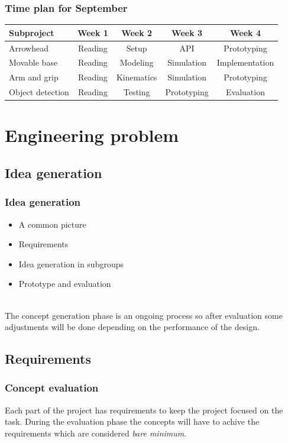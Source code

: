\documentclass{beamer}
\begin{document}
\begin{frame}
    \frametitle{Time plan for September}
    \begin{table}
        \begin{tabular}{l | c | c | c | c }
        Subproject & Week 1 & Week 2 & Week 3 & Week 4 \\
        \hline \hline
            Arrowhead & Reading& Setup & API & Prototyping\\
            Movable base & Reading& Modeling & Simulation & Implementation\\
            Arm and grip  & Reading & Kinematics & Simulation& Prototyping\\
            Object detection & Reading & Testing & Prototyping & Evaluation\\
        \end{tabular}
    \end{table}
\end{frame}

\section{Engineering problem}
\begin{frame}
    \subsection{Idea generation}
    \frametitle{Idea generation} 
    \begin{itemize}
        \item A common picture
        \item Requirements
        \item Idea generation in subgroups
        \item Prototype and evaluation\\~\
    \end{itemize} 

    The concept generation phase is an ongoing process so after evaluation
    some adjustments will be done depending on the performance
    of the design.
\end{frame}

\begin{frame}
    \subsection{Requirements}
    \frametitle{Concept evaluation}
    Each part of the project has requirements to keep the project focused 
    on the task. During the evaluation phase the concepts will have to achive
    the requirements which are considered \textit{bare minimum}. 
\end{frame}
\end{document}
